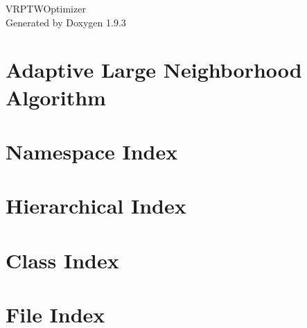 \documentclass[twoside]{book}
\newcommand{\+}{\discretionary{\mbox{\scriptsize$\hookleftarrow$}}{}{}}
\newcommand{\clearemptydoublepage}{%
    \newpage{\pagestyle{empty}\cleardoublepage}%
  }
\begin{document}
  \raggedbottom
    \hypersetup{pageanchor=false,
                bookmarksnumbered=true,
                pdfencoding=unicode
               }
  \begin{titlepage}
  \vspace*{7cm}
  \begin{center}%
  {\Large VRPTWOptimizer}\\
  \vspace*{1cm}
  {\large Generated by Doxygen 1.9.3}\\
  \end{center}
  \end{titlepage}
  \clearemptydoublepage
  \tableofcontents
  \clearemptydoublepage
  \hypersetup{pageanchor=true}
\chapter{Adaptive Large Neighborhood Algorithm}
\label{md__c___users_mokulewicz__documents__repozytoria_autonomicznyspedytor_vrptwsolver__v_r_p_t_w_optimizer__b_l__a_l_n_s__readme}

\chapter{Namespace Index}

\chapter{Hierarchical Index}

\chapter{Class Index}

\chapter{File Index}

\end{document}
